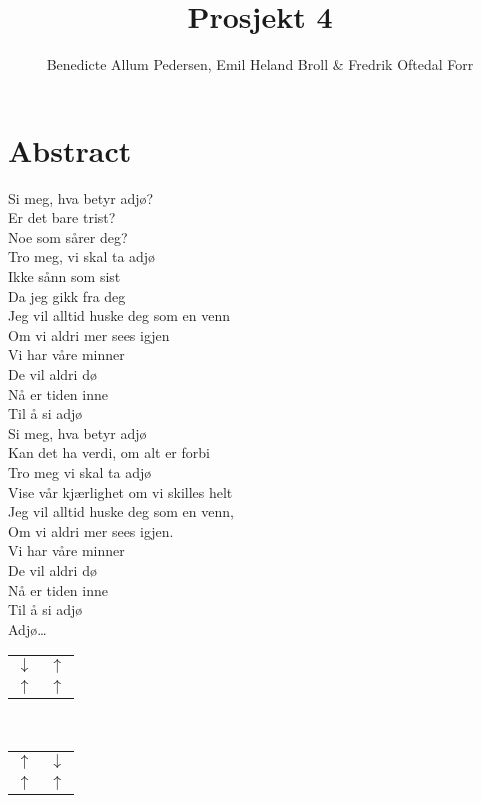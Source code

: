 \documentclass{article}
\title{Prosjekt 4}\vspace{-3ex}
\author{Benedicte Allum Pedersen, Emil Heland Broll & Fredrik Oftedal Forr}
\date{\vspace{-5ex}}
\begin{document}
\maketitle

\section*{Abstract}
Si meg, hva betyr adjø?\\
Er det bare trist?\\
Noe som sårer deg?\\
Tro meg, vi skal ta adjø\\
Ikke sånn som sist\\
Da jeg gikk fra deg\\


\noindent Jeg vil alltid huske deg som en venn\\
Om vi aldri mer sees igjen\\
Vi har våre minner\\
De vil aldri dø\\
Nå er tiden inne\\
Til å si adjø\\


\noindent Si meg, hva betyr adjø\\
Kan det ha verdi, om alt er forbi\\
Tro meg vi skal ta adjø\\
Vise vår kjærlighet om vi skilles helt\\
Jeg vil alltid huske deg som en venn,\\
Om vi aldri mer sees igjen.\\


\noindent Vi har våre minner\\
De vil aldri dø\\
Nå er tiden inne\\
Til å si adjø\\
Adjø…\\


\begin{tabular}{c c}
  $\downarrow$ & $\uparrow$\\
  $\uparrow$ & $\uparrow$
\end{tabular}\\

\begin{tabular}{c c}
  $\uparrow$ & $\downarrow$\\
  $\uparrow$ & $\uparrow$
\end{tabular}\\
\end{document}
